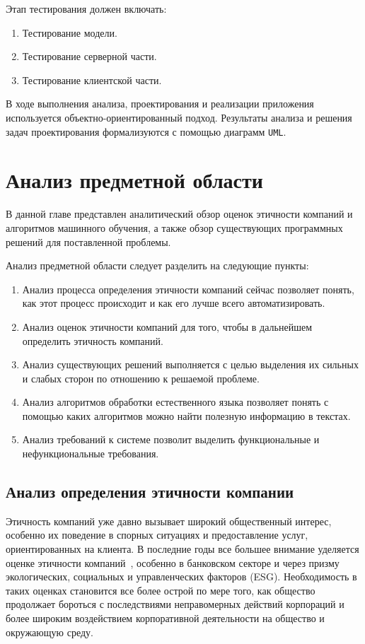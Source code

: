 \documentclass[PI, VKR]{HSEUniversity}
\begin{document}
Этап тестирования должен включать:
\begin{enumerate}
\item Тестирование модели.
\item Тестирование серверной части.
\item Тестирование клиентской части.
\end{enumerate}

В ходе выполнения анализа, проектирования и реализации приложения используется объектно-ориентированный подход. Результаты анализа и решения задач проектирования формализуются с помощью диаграмм \texttt{UML}.
\chapter{Анализ предметной области}
\label{sec:org9cb66ef}
В данной главе представлен аналитический обзор оценок этичности компаний и алгоритмов машинного обучения, а также обзор существующих программных решений для поставленной проблемы.

Анализ предметной области следует разделить на следующие пункты:
\begin{enumerate}
\item Анализ процесса определения этичности компаний сейчас позволяет понять, как этот процесс происходит и как его лучше всего автоматизировать.
\item Анализ оценок этичности компаний для того, чтобы в дальнейшем определить этичность компаний.
\item Анализ существующих решений выполняется с целью выделения их сильных и слабых сторон по отношению к решаемой проблеме.
\item Анализ алгоритмов обработки естественного языка позволяет понять с помощью каких алгоритмов можно найти полезную информацию в текстах.
\item Анализ требований к системе позволит выделить функциональные и нефункциональные требования.
\end{enumerate}
\section{Анализ определения этичности компании}
\label{sec:org1842885}
Этичность компаний уже давно вызывает широкий общественный интерес, особенно их поведение в спорных ситуациях и предоставление услуг, ориентированных на клиента. В последние годы все большее внимание уделяется оценке этичности компаний~\autocites{mure_esg_2021}[][]{semenko_korporativnaya_2022}[][]{kudryavceva_korporativnosocialnaya_2016}, особенно в банковском секторе и через призму экологических, социальных и управленческих факторов (ESG). Необходимость в таких оценках становится все более острой по мере того, как общество продолжает бороться с последствиями неправомерных действий корпораций и более широким воздействием корпоративной деятельности на общество и окружающую среду.
\end{document}
